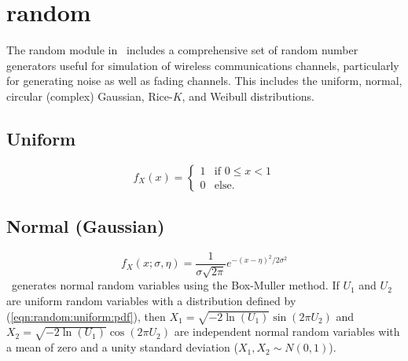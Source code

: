 % 
%

\newpage
\section{random}
\label{module:random}
The random module in \liquid\ includes a comprehensive set of
random number generators useful for simulation of wireless
communications channels,
particularly for generating noise as well as fading channels.
This includes the
uniform,
normal,
circular (complex) Gaussian,
Rice-$K$, and
Weibull distributions.


% 
%
\subsection{Uniform}
\label{module:random:uniform}
%
\begin{equation}
\label{eqn:random:uniform:pdf}
    f_X(x) =
    \begin{cases}
        1 & \text{if $0 \leq x < 1$} \\
        0 & \text{else}.
    \end{cases}
\end{equation}

\subsection{Normal (Gaussian)}
\label{module:random:normal}
%
\begin{equation}
\label{eqn:random:normal:pdf}
    f_X(x;\sigma,\eta) =
        \frac{1}{\sigma \sqrt{2 \pi}}
        e^{-\left(x-\eta\right)^2/{2\sigma^2}}
\end{equation}
%
\liquid\ generates normal random variables using the Box-Muller method.
If $U_1$ and $U_2$ are uniform random variables with a distribution
defined by (\ref{eqn:random:uniform:pdf}), then
$X_1 = \sqrt{-2\ln(U_1)} \sin\left(2 \pi U_2\right)$ and
$X_2 = \sqrt{-2\ln(U_1)} \cos\left(2 \pi U_2\right)$
are independent normal random variables with a mean of zero and a unity
standard deviation ($X_1, X_2 \sim N(0,1)$).

% 
%
